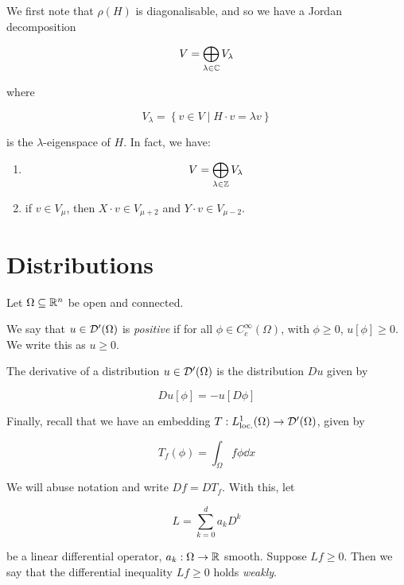 \documentclass{report}
\begin{document}
We first note that \(\rho(H)\) is diagonalisable, and so we have a Jordan decomposition

\[V = \bigoplus_{\lambda \in \mathbb{C}}V_\lambda\]

where

\[V_\lambda = \left\{v \in V \mid H \cdot v = \lambda v\right\}\]

is the \(\lambda\)-eigenspace of \(H\). In fact, we have:

\begin{enumerate}
    \item \[V = \bigoplus_{\lambda \in \mathbb{Z}}V_\lambda\]
    \item if \(v \in V_\mu\), then \(X \cdot v \in V_{\mu+2}\) and \(Y \cdot v \in V_{\mu-2}\).
\end{enumerate}

\section{Distributions}

\label{sec:distributions}

Let \(\Omega \subseteq \mathbb{R}^n\) be open and connected.

\begin{definition}
    [positive]
    We say that \(u \in \mathcal{D}'(\Omega)\) is \emph{positive} if for all \(\phi \in C_c^\infty(\Omega)\), with \(\phi \ge 0\), \(u[\phi] \ge 0\). We write this as \(u \ge 0\). 
\end{definition}

\begin{definition}
    [derivative]

    The derivative of a distribution \(u \in \mathcal{D}'(\Omega)\) is the distribution \(Du\) given by

    \[Du[\phi] = -u[D\phi]\]
\end{definition}

Finally, recall that we have an embedding \(T : L^1_\text{loc.}(\Omega) \to \mathcal{D}'(\Omega)\), given by

\[T_f(\phi) = \int_\Omega f\phi \dd x\]

We will abuse notation and write \(Df = DT_f\). With this, let

\[L = \sum_{k=0}^d a_k D^k\]

be a linear differential operator, \(a_k : \Omega \to \mathbb{R}\) smooth. Suppose \(Lf \ge 0\). Then we say that the differential inequality \(Lf \ge 0\) holds \emph{weakly}.

\printbibliography
\end{document}
